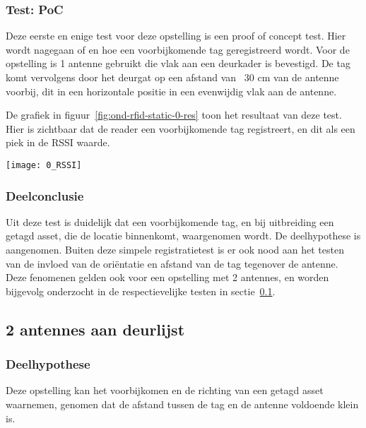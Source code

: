 \subsubsection{Test: PoC}
\label{sec:ond-rfid-1-1}
Deze eerste en enige test voor deze opstelling is een proof of concept test. Hier wordt nagegaan of en hoe een voorbijkomende tag geregistreerd wordt. Voor de opstelling is 1 antenne gebruikt die vlak aan een deurkader is bevestigd. De tag komt vervolgens door het deurgat op een afstand van ~30 cm van de antenne voorbij, dit in een horizontale positie in een evenwijdig vlak aan de antenne.

\begin{minipage}{0.55\textwidth}
De grafiek in figuur~\ref{fig:ond-rfid-static-0-res} toon het resultaat van deze test. Hier is zichtbaar dat de reader een voorbijkomende tag registreert, en dit als een piek in de RSSI waarde.
\end{minipage}
\hfill
\begin{minipage}{0.42\textwidth}
	\texttt{[image: 0\_RSSI]}
	\label{fig:ond-rfid-static-0-res}
\end{minipage}

\subsubsection{Deelconclusie}
Uit deze test is duidelijk dat een voorbijkomende tag, en bij uitbreiding een getagd asset, die de locatie binnenkomt, waargenomen wordt. De deelhypothese is aangenomen. Buiten deze simpele registratietest is er ook nood aan het testen van de invloed van de oriëntatie en afstand van de tag tegenover de antenne. Deze fenomenen gelden ook voor een opstelling met 2 antennes, en worden bijgevolg onderzocht in de respectievelijke testen in sectie~\ref{sec:ond-rfid-2}.

\subsection{2 antennes aan deurlijst}
\label{sec:ond-rfid-2}
\subsubsection{Deelhypothese}
Deze opstelling kan het voorbijkomen en de richting van een getagd asset waarnemen, genomen dat de afstand tussen de tag en de antenne voldoende klein is.


